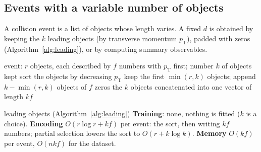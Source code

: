 \documentclass[11pt]{article}
\begin{document}
\subsection{Events with a variable number of objects}\label{sec:events}

A collision event is a list of objects whose length varies. A fixed $d$ is obtained by keeping the $k$ leading
objects (by transverse momentum $p_{\mathrm T}$), padded with zeros (Algorithm~\ref{alg:leading}), or by computing
summary observables.

\begin{algorithm}[H]
\caption{A fixed-length vector from an event with a variable number of objects}\label{alg:leading}
\begin{algorithmic}[1]
\Require event: $r$ objects, each described by $f$ numbers with $p_{\mathrm T}$ first; number $k$ of objects kept
  \State sort the objects by decreasing $p_{\mathrm T}$ 
  \State keep the first $\min(r, k)$ objects; append $k - \min(r, k)$ objects of $f$ zeros 
  \State \Return the $k$ objects concatenated into one vector of length $kf$
\EndFunction
\end{algorithmic}
\end{algorithm}

\begin{runtime}{leading objects (Algorithm~\ref{alg:leading})}
\textbf{Training}: none, nothing is fitted ($k$ is a choice). \textbf{Encoding} $O(r \log r + kf)$ per event: the
sort, then writing $kf$ numbers; partial selection lowers the sort to $O(r + k \log k)$. \textbf{Memory} $O(kf)$ per
event, $O(nkf)$ for the dataset.
\end{runtime}
\end{document}
